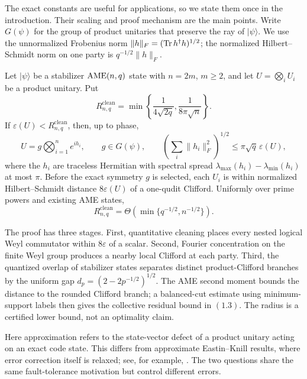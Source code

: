The exact constants are useful for applications, so we state them once in
the introduction.  Their scaling and proof mechanism are the main points.
Write \(G(\psi)\) for the group of product unitaries that preserve the ray
of \(\lvert\psi\rangle\).  We use the unnormalized Frobenius norm
\(\|h\|_F=(\operatorname{Tr} h^\dagger h)^{1/2}\); the normalized Hilbert--Schmidt
norm on one party is \(q^{-1/2}\|h\|_F\).

\begin{theorem}\label{thm:quantitative-rounding}
Let \(\lvert\psi\rangle\) be a stabilizer \(\mathrm{AME}(n,q)\) state with
\(n=2m\), \(m\geq2\), and let \(U=\bigotimes_iU_i\) be a product
unitary.  Put
\[
 R^{\mathrm{clean}}_{n,q}=
 \min\left\{\frac1{4\sqrt{2q}},\frac1{8\pi\sqrt n}\right\}.       \tag{1.2}
\]
If \(\varepsilon(U)<R^{\mathrm{clean}}_{n,q}\), then, up to phase,
\[
 U=g\bigotimes_{i=1}^n e^{ih_i},\qquad g\in G(\psi),
 \qquad
 \left(\sum_i\lVert h_i\rVert_F^2\right)^{1/2}
   \leq\pi\sqrt q\,\varepsilon(U),                     \tag{1.3}
\]
where the \(h_i\) are traceless Hermitian with spectral spread
\(\lambda_{\max}(h_i)-\lambda_{\min}(h_i)\) at most \(\pi\).  Before the
exact symmetry \(g\) is selected, each \(U_i\) is
within normalized Hilbert--Schmidt distance \(8\varepsilon(U)\) of a
one-qudit Clifford.  Uniformly over prime powers and existing AME states,
\[
 R^{\mathrm{clean}}_{n,q}
 =\Theta\!\left(\min\{q^{-1/2},n^{-1/2}\}\right).
\]
\end{theorem}

The proof has three stages.  First, quantitative cleaning places every
nested logical Weyl commutator within \(8\varepsilon\) of a scalar.
Second, Fourier concentration on the finite Weyl group produces a nearby
local Clifford at each party.  Third, the quantized overlap of stabilizer
states separates distinct product-Clifford branches by the uniform gap
\(d_p=(2-2p^{-1/2})^{1/2}\).  The AME second moment bounds the distance to the rounded Clifford branch;
a balanced-cut estimate using minimum-support labels then gives the
collective residual bound in \((1.3)\).  The radius is a
certified lower bound, not an optimality claim.

Here approximation refers to the state-vector defect of a product unitary
acting on an exact code state.  This differs from approximate
Eastin--Knill results, where error correction itself is relaxed; see, for
example, \cite{Alexander2025}.  The two questions share the same
fault-tolerance motivation but control different errors.

